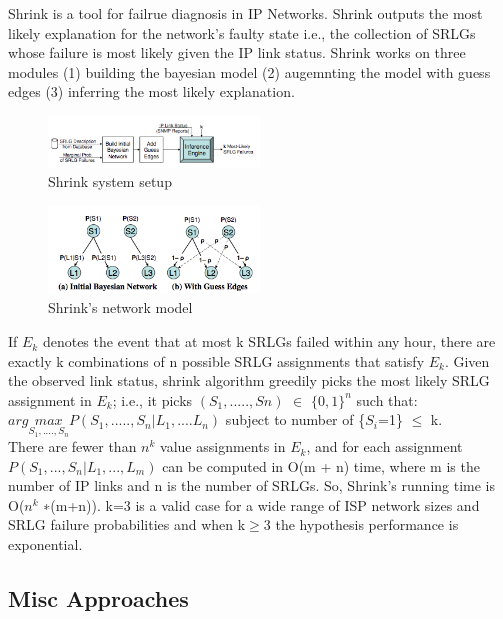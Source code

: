 \documentclass[10pt]{sigplan-proc-varsize}
\begin{document}
\cite{Kandula:05} Shrink is a tool for failrue diagnosis in IP Networks. Shrink outputs the most likely explanation for the network's faulty state i.e., the collection of SRLGs whose failure is most likely given the IP link status. Shrink works on three modules (1) building the bayesian model (2) augemnting the model with guess edges (3) inferring the most likely explanation.

\begin{figure}[h!]
  \caption{Shrink system setup}
  \centering
    \includegraphics[width=0.5\textwidth]{Fig8}
\end{figure}

\begin{figure}[h!]
  \caption{Shrink's network model}
  \centering
    \includegraphics[width=0.5\textwidth]{Fig9}
\end{figure}

If $E_k$ denotes the event that at most k SRLGs failed within any hour, there are exactly k combinations of n possible SRLG assignments that satisfy $E_k$. Given the observed link status, shrink algorithm greedily picks the most likely SRLG assignment in $E_k$; i.e., it picks $(S_1,.....,Sn)$ $\in$ $\{0,1\}^n$ such that: \\
$arg \underset{S_1,....,S_n}{max} P(S_1,.....,S_n|L_1,....L_n)$ subject to number of \{$S_i$=1\} $\leq$ k. \\
There are fewer than $n^k$ value assignments in $E_k$, and for each assignment $P(S_1,...,S_n|L_1,...,L_m)$ can be computed in O(m + n) time, where m is the number of IP links and n is the number of SRLGs. So, Shrink’s running time is O($n^k$ ∗(m+n)). k=3 is a valid case for a wide range of ISP network sizes and SRLG failure probabilities and when k$\geq$3 the hypothesis performance is exponential. 

\subsection{Misc Approaches}
\end{document}
